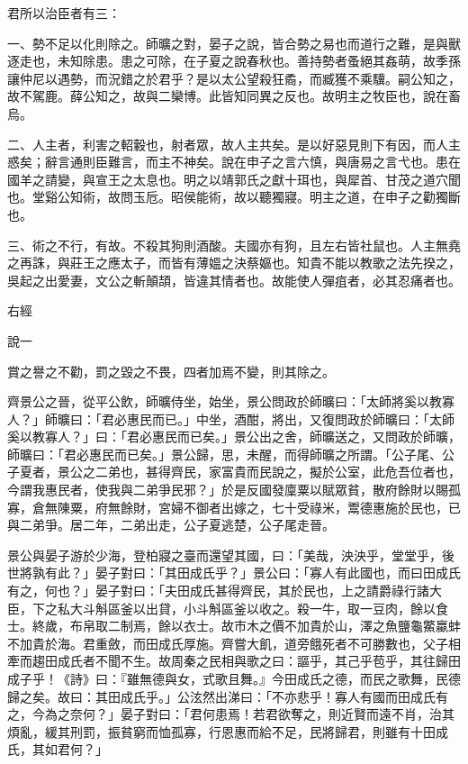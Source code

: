 
\begin{pinyinscope}
君所以治臣者有三：

一、勢不足以化則除之。師曠之對，晏子之說，皆合勢之易也而道行之難，是與獸逐走也，未知除患。患之可除，在子夏之說春秋也。善持勢者蚤絕其姦萌，故季孫讓仲尼以遇勢，而況錯之於君乎？是以太公望殺狂矞，而臧獲不乘驥。嗣公知之，故不駕鹿。薛公知之，故與二欒博。此皆知同異之反也。故明主之牧臣也，說在畜烏。

二、人主者，利害之軺轂也，射者眾，故人主共矣。是以好惡見則下有因，而人主惑矣；辭言通則臣難言，而主不神矣。說在申子之言六慎，與唐易之言弋也。患在國羊之請變，與宣王之太息也。明之以靖郭氏之獻十珥也，與犀首、甘茂之道穴聞也。堂谿公知術，故問玉卮。昭侯能術，故以聽獨寢。明主之道，在申子之勸獨斷也。

三、術之不行，有故。不殺其狗則酒酸。夫國亦有狗，且左右皆社鼠也。人主無堯之再誅，與莊王之應太子，而皆有薄媼之決蔡嫗也。知貴不能以教歌之法先揆之，吳起之出愛妻，文公之斬顛頡，皆違其情者也。故能使人彈疽者，必其忍痛者也。

右經

說一

賞之譽之不勸，罰之毀之不畏，四者加焉不變，則其除之。

齊景公之晉，從平公飲，師曠侍坐，始坐，景公問政於師曠曰：「太師將奚以教寡人？」師曠曰：「君必惠民而已。」中坐，酒酣，將出，又復問政於師曠曰：「太師奚以教寡人？」曰：「君必惠民而已矣。」景公出之舍，師曠送之，又問政於師曠，師曠曰：「君必惠民而已矣。」景公歸，思，未醒，而得師曠之所謂。「公子尾、公子夏者，景公之二弟也，甚得齊民，家富貴而民說之，擬於公室，此危吾位者也，今謂我惠民者，使我與二弟爭民邪？」於是反國發廩粟以賦眾貧，散府餘財以賜孤寡，倉無陳粟，府無餘財，宮婦不御者出嫁之，七十受祿米，鬻德惠施於民也，已與二弟爭。居二年，二弟出走，公子夏逃楚，公子尾走晉。

景公與晏子游於少海，登柏寢之臺而還望其國，曰：「美哉，泱泱乎，堂堂乎，後世將孰有此？」晏子對曰：「其田成氏乎？」景公曰：「寡人有此國也，而曰田成氏有之，何也？」晏子對曰：「夫田成氏甚得齊民，其於民也，上之請爵祿行諸大臣，下之私大斗斛區釜以出貸，小斗斛區釜以收之。殺一牛，取一豆肉，餘以食士。終歲，布帛取二制焉，餘以衣士。故市木之價不加貴於山，澤之魚鹽龜鱉蠃蚌不加貴於海。君重斂，而田成氏厚施。齊嘗大飢，道旁餓死者不可勝數也，父子相牽而趨田成氏者不聞不生。故周秦之民相與歌之曰：謳乎，其己乎苞乎，其往歸田成子乎！《詩》曰：『雖無德與女，式歌且舞。』今田成氏之德，而民之歌舞，民德歸之矣。故曰：其田成氏乎。」公泫然出涕曰：「不亦悲乎！寡人有國而田成氏有之，今為之奈何？」晏子對曰：「君何患焉！若君欲奪之，則近賢而遠不肖，治其煩亂，緩其刑罰，振貧窮而恤孤寡，行恩惠而給不足，民將歸君，則雖有十田成氏，其如君何？」


\end{pinyinscope}
